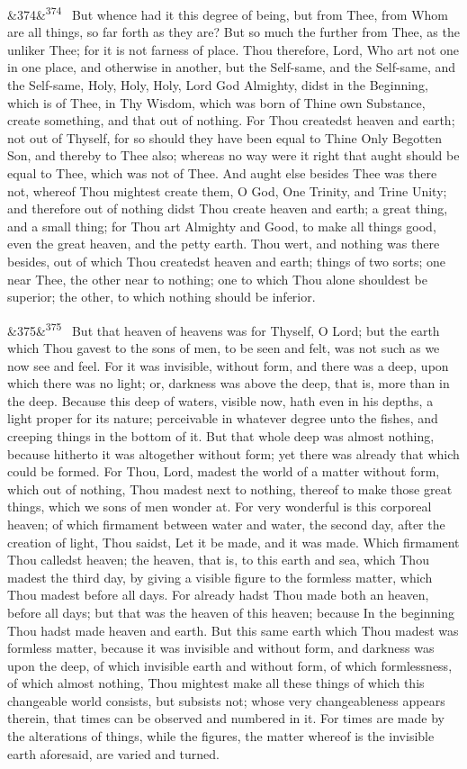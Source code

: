 \documentclass[12pt]{article}
\newcommand{\para}[1][]{\par\noindent\ifx&#1&\else\textsuperscript{\footnotesize #1}~\fi}
\begin{document}
\para[374] But whence had it this degree of being, but from Thee, from Whom are all things, so far forth as they are? But so much the further from Thee, as the unliker Thee; for it is not farness of place. Thou therefore, Lord, Who art not one in one place, and otherwise in another, but the Self-same, and the Self-same, and the Self-same, Holy, Holy, Holy, Lord God Almighty, didst in the Beginning, which is of Thee, in Thy Wisdom, which was born of Thine own Substance, create something, and that out of nothing. For Thou createdst heaven and earth; not out of Thyself, for so should they have been equal to Thine Only Begotten Son, and thereby to Thee also; whereas no way were it right that aught should be equal to Thee, which was not of Thee. And aught else besides Thee was there not, whereof Thou mightest create them, O God, One Trinity, and Trine Unity; and therefore out of nothing didst Thou create heaven and earth; a great thing, and a small thing; for Thou art Almighty and Good, to make all things good, even the great heaven, and the petty earth. Thou wert, and nothing was there besides, out of which Thou createdst heaven and earth; things of two sorts; one near Thee, the other near to nothing; one to which Thou alone shouldest be superior; the other, to which nothing should be inferior.

\para[375] But that heaven of heavens was for Thyself, O Lord; but the earth which Thou gavest to the sons of men, to be seen and felt, was not such as we now see and feel. For it was invisible, without form, and there was a deep, upon which there was no light; or, darkness was above the deep, that is, more than in the deep. Because this deep of waters, visible now, hath even in his depths, a light proper for its nature; perceivable in whatever degree unto the fishes, and creeping things in the bottom of it. But that whole deep was almost nothing, because hitherto it was altogether without form; yet there was already that which could be formed. For Thou, Lord, madest the world of a matter without form, which out of nothing, Thou madest next to nothing, thereof to make those great things, which we sons of men wonder at. For very wonderful is this corporeal heaven; of which firmament between water and water, the second day, after the creation of light, Thou saidst, Let it be made, and it was made. Which firmament Thou calledst heaven; the heaven, that is, to this earth and sea, which Thou madest the third day, by giving a visible figure to the formless matter, which Thou madest before all days. For already hadst Thou made both an heaven, before all days; but that was the heaven of this heaven; because In the beginning Thou hadst made heaven and earth. But this same earth which Thou madest was formless matter, because it was invisible and without form, and darkness was upon the deep, of which invisible earth and without form, of which formlessness, of which almost nothing, Thou mightest make all these things of which this changeable world consists, but subsists not; whose very changeableness appears therein, that times can be observed and numbered in it. For times are made by the alterations of things, while the figures, the matter whereof is the invisible earth aforesaid, are varied and turned.
\end{document}
